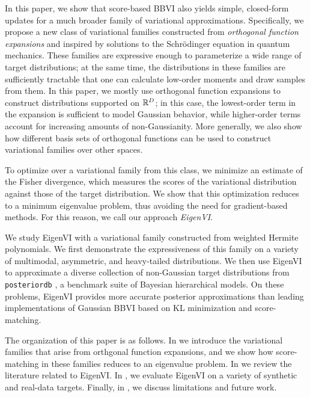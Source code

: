 In this paper, we show that score-based BBVI also yields simple, closed-form updates for a much broader family of variational approximations. Specifically, we
propose a new class of variational families constructed from
\textit{orthogonal function expansions} and inspired by solutions to the Schr\"odinger equation in quantum mechanics. These families are expressive enough to
parameterize a wide range of target distributions; at the same time, the distributions in these families are sufficiently tractable that one can calculate low-order moments and draw samples from them. In this paper, we mostly use orthogonal function expansions to construct distributions supported on $\mathbb{R}^D$; in this case, the lowest-order term in the expansion is sufficient to model Gaussian behavior, while higher-order terms account for increasing amounts of non-Gaussianity. More generally, we also show how different basis sets of orthogonal functions can be used to construct variational families over other spaces.


To optimize over a variational family from this class, we minimize an
estimate of the Fisher divergence, which measures the scores of the
variational distribution against those of the target distribution. We
show that this optimization reduces to a minimum
eigenvalue problem, thus avoiding the need for gradient-based methods.
For this reason, we call our approach \emph{EigenVI}.

We study EigenVI with a variational family constructed from weighted
Hermite polynomials. We first demonstrate the expressiveness of this family on a
variety of
multimodal, asymmetric, and heavy-tailed distributions. We then use EigenVI to approximate a diverse collection of
non-Gaussian target distributions from \texttt{posteriordb}
\citep{magnusson2022posteriordb}, a benchmark suite of Bayesian
hierarchical models. On these problems, EigenVI provides more accurate posterior approximations than leading implementations of Gaussian
BBVI based on KL minimization and score-matching.


The organization of this paper is as follows.
In  we introduce the variational families that arise from orthgonal function expansions, and we
show how score-matching in these families reduces to an
eigenvalue problem. In  we review the literature related
to EigenVI. In , we evaluate EigenVI on a
variety of synthetic and real-data targets. Finally, in ,
we discuss limitations and future work.




%
%
